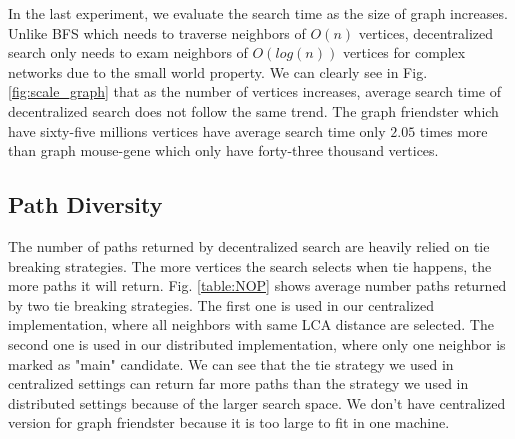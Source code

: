In the last experiment, we evaluate the search time as the size of graph increases. Unlike BFS which needs to traverse neighbors of $O(n)$ vertices, decentralized search only needs to exam neighbors of $O(log(n))$ vertices for complex networks due to the small world property. We can clearly see in Fig. \ref{fig:scale_graph} that as the number of vertices increases, average search time of decentralized search does not follow the same trend. The graph friendster which have sixty-five millions vertices have average search time only $2.05$ times more than graph mouse-gene which only have forty-three thousand vertices.

\subsection{Path Diversity}
\label{eval_diversity}

The number of paths returned by decentralized search are heavily relied on tie breaking strategies. The more vertices the search selects when tie happens, the more paths it will return. Fig. \ref{table:NOP} shows average number paths returned by two tie breaking strategies. The first one is used in our centralized implementation, where all neighbors with same LCA distance are selected. The second one is used in our distributed implementation, where only one neighbor is marked as "main" candidate. We can see that the tie strategy we used in centralized settings can return far more paths than the strategy we used in distributed settings because of the larger search space. We don't have centralized version for graph friendster because it is too large to fit in one machine.


%
%
